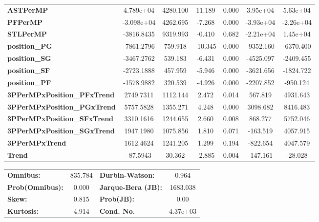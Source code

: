 \begin{center}
\begin{tabular}{lcccccc}
\textbf{ASTPerMP}                   &    4.789e+04  &     4280.100     &    11.189  &         0.000        &     3.95e+04    &     5.63e+04     \\
\textbf{PFPerMP}                    &   -3.098e+04  &     4262.695     &    -7.268  &         0.000        &    -3.93e+04    &    -2.26e+04     \\
\textbf{STLPerMP}                   &   -3816.8435  &     9319.993     &    -0.410  &         0.682        &    -2.21e+04    &     1.45e+04     \\
\textbf{position\_PG}               &   -7861.2796  &      759.918     &   -10.345  &         0.000        &    -9352.160    &    -6370.400     \\
\textbf{position\_SG}               &   -3467.2762  &      539.183     &    -6.431  &         0.000        &    -4525.097    &    -2409.455     \\
\textbf{position\_SF}               &   -2723.1888  &      457.959     &    -5.946  &         0.000        &    -3621.656    &    -1824.722     \\
\textbf{position\_PF}               &   -1578.9882  &      320.539     &    -4.926  &         0.000        &    -2207.852    &     -950.124     \\
\textbf{3PPerMPxPosition\_PFxTrend} &    2749.7311  &     1112.144     &     2.472  &         0.014        &      567.819    &     4931.643     \\
\textbf{3PPerMPxPosition\_PGxTrend} &    5757.5828  &     1355.271     &     4.248  &         0.000        &     3098.682    &     8416.483     \\
\textbf{3PPerMPxPosition\_SFxTrend} &    3310.1616  &     1244.655     &     2.660  &         0.008        &      868.277    &     5752.046     \\
\textbf{3PPerMPxPosition\_SGxTrend} &    1947.1980  &     1075.856     &     1.810  &         0.071        &     -163.519    &     4057.915     \\
\textbf{3PPerMPxTrend}              &    1612.4624  &     1241.205     &     1.299  &         0.194        &     -822.654    &     4047.579     \\
\textbf{Trend}                      &     -87.5943  &       30.362     &    -2.885  &         0.004        &     -147.161    &      -28.028     \\
\bottomrule
\end{tabular}
\begin{tabular}{lclc}
\textbf{Omnibus:}       & 835.784 & \textbf{  Durbin-Watson:     } &    0.964  \\
\textbf{Prob(Omnibus):} &   0.000 & \textbf{  Jarque-Bera (JB):  } & 1683.038  \\
\textbf{Skew:}          &   0.815 & \textbf{  Prob(JB):          } &     0.00  \\
\textbf{Kurtosis:}      &   4.914 & \textbf{  Cond. No.          } & 4.37e+03  \\
\bottomrule
\end{tabular}
\end{center}

